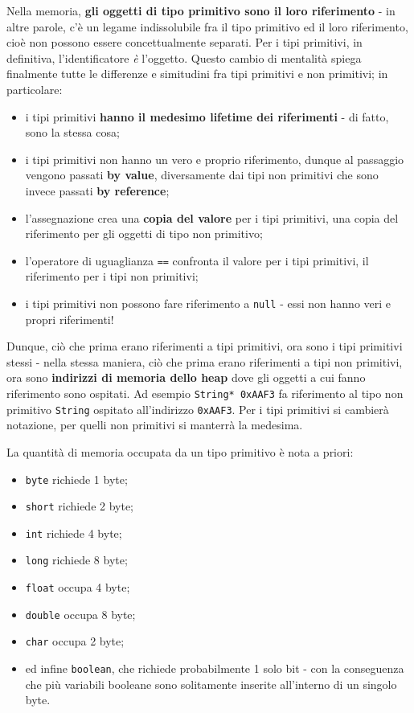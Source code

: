 \documentclass[\fontsizeclass,twocolumn]{\classname}
\theoremstyle{definition}
\theoremstyle{definition}
\begin{document}
Nella memoria, \textbf{gli oggetti di tipo primitivo sono il loro riferimento}
\-- in altre parole, c'è un legame indissolubile fra il tipo primitivo ed il
loro riferimento, cioè non possono essere concettualmente separati. Per i tipi
primitivi, in definitiva, l'identificatore \emph{è} l'oggetto. Questo cambio di
mentalità spiega finalmente tutte le differenze e simitudini fra tipi primitivi
e non primitivi; in particolare: 
\begin{itemize}
    \item i tipi primitivi \textbf{hanno il medesimo lifetime dei riferimenti}
        \-- di fatto, sono la stessa cosa;
    \item i tipi primitivi non hanno un vero e proprio riferimento, dunque al
        passaggio vengono passati \textbf{by value}, diversamente dai tipi non
        primitivi che sono invece passati \textbf{by reference}; 
    \item l'assegnazione crea una \textbf{copia del valore} per i tipi primitivi,
        una copia del riferimento per gli oggetti di tipo non primitivo;
    \item l'operatore di uguaglianza \texttt{==} confronta il valore per i tipi
        primitivi, il riferimento per i tipi non primitivi;
    \item i tipi primitivi non possono fare riferimento a \texttt{null} \--
        essi non hanno veri e propri riferimenti!
\end{itemize}

Dunque, ciò che prima erano riferimenti a tipi primitivi, ora sono i tipi
primitivi stessi \-- nella stessa maniera, ciò che prima erano riferimenti a
tipi non primitivi, ora sono \textbf{indirizzi di memoria dello heap} dove gli
oggetti a cui fanno riferimento sono ospitati. Ad esempio \texttt{String*
0xAAF3} fa riferimento al tipo non primitivo \texttt{String} ospitato
all'indirizzo \texttt{0xAAF3}. Per i tipi primitivi si cambierà notazione, per
quelli non primitivi si manterrà la medesima.

La quantità di memoria occupata da un tipo primitivo è nota a priori:
\begin{itemize}
    \item \texttt{byte} richiede 1 byte;
    \item \texttt{short} richiede 2 byte;
    \item \texttt{int} richiede 4 byte;
    \item \texttt{long} richiede 8 byte;
    \item \texttt{float} occupa 4 byte;
    \item \texttt{double} occupa 8 byte;
    \item \texttt{char} occupa 2 byte;
    \item ed infine \texttt{boolean}, che richiede probabilmente 1 solo bit \--
        con la conseguenza che più variabili booleane sono solitamente inserite
        all'interno di un singolo byte.
\end{itemize}
\end{document}
